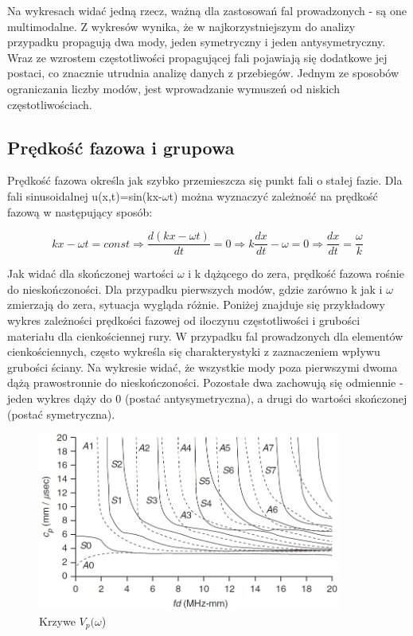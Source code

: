 Na wykresach widać jedną rzecz, ważną dla zastosowań fal prowadzonych - są one multimodalne. Z wykresów wynika, że w najkorzystniejszym do analizy przypadku propagują dwa mody, jeden symetryczny i jeden antysymetryczny. Wraz ze wzrostem częstotliwości propagującej fali pojawiają się dodatkowe jej postaci, co znacznie utrudnia analizę danych z przebiegów. Jednym ze sposobów ograniczania liczby modów, jest wprowadzanie wymuszeń od niskich częstotliwościach.

\subsection{Prędkość fazowa i grupowa}

Prędkość fazowa określa jak szybko przemieszcza się punkt fali o stałej fazie. Dla fali sinusoidalnej u(x,t)=sin(kx-\(\omega\)t) można wyznaczyć zależność na prędkość fazową w następujący sposób:

\begin{equation}
kx-\omega t=const \Rightarrow \frac{d(kx-\omega t)}{dt}=0 \Rightarrow k\frac{dx}{dt}-\omega=0
 \Rightarrow \frac{dx}{dt}=\frac{\omega}{k}
\end{equation}

Jak widać dla skończonej wartości \(\omega\) i k dążącego do zera, prędkość fazowa rośnie do nieskończoności. Dla przypadku pierwszych modów, gdzie zarówno k jak i \(\omega\) zmierzają do zera, sytuacja wygląda różnie. Poniżej znajduje się przykładowy wykres zależności prędkości fazowej od iloczynu częstotliwości i grubości materiału dla cienkościennej rury. W przypadku fal prowadzonych dla elementów cienkościennych, często wykreśla się charakterystyki z zaznaczeniem wpływu grubości ściany. Na wykresie widać, że wszystkie mody poza pierwszymi dwoma dążą prawostronnie do nieskończoności. Pozostałe dwa zachowują się odmiennie - jeden wykres dąży do 0 (postać antysymetryczna), a drugi do wartości skończonej (postać symetryczna).

\begin{figure}[h]
\centering
\includegraphics[width=10cm]{Zdjecia/2/char_predkosc_fazowa}
\caption{Krzywe \(V_p(\omega\))}
\label{fig:krzywe_vp_od_omega}
\end{figure}

